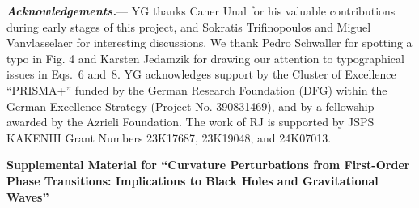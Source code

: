\documentclass[twocolumn,superscriptaddress,aps,preprintnumbers,amsmath,amssymb,prl,footinbib]{revtex4-2}
\newif\ifarxiv
\begin{document}
\textit{\textbf{ Acknowledgements.}}---
YG thanks Caner Unal for his valuable contributions during early stages of this project, and Sokratis Trifinopoulos and Miguel Vanvlasselaer for interesting discussions. We thank Pedro Schwaller for spotting a typo in Fig. 4 and Karsten Jedamzik for drawing our attention to typographical issues in Eqs.~6 and~8.
YG acknowledges support by the Cluster of Excellence ``PRISMA+'' funded by the German Research Foundation (DFG) within the German Excellence Strategy (Project No. 390831469), and by a fellowship awarded by the Azrieli Foundation.
The work of RJ is supported by JSPS KAKENHI Grant Numbers 23K17687, 23K19048, and 24K07013.






\appendix
\onecolumngrid

\fontsize{11}{13}\selectfont

\makeatletter
\long{}
\makeatother



















\newpage
\vspace{1cm}

\ifarxiv



\begin{center}
\textbf{\it\Large Supplemental Material}
\end{center}
\renewcommand{\tocname}{\it
\vspace{-1.5cm}
}

\else



\begin{center}
\textbf{\large Supplemental Material for ``Curvature Perturbations from First-Order Phase Transitions:
Implications to Black Holes and Gravitational Waves''}
\end{center}

\noindent
\renewcommand{\tocname}{\it
\vspace{-1cm}
Gabriele Franciolini, Yann Gouttenoire, Ryusuke Jinno
}
\fi
\end{document}
